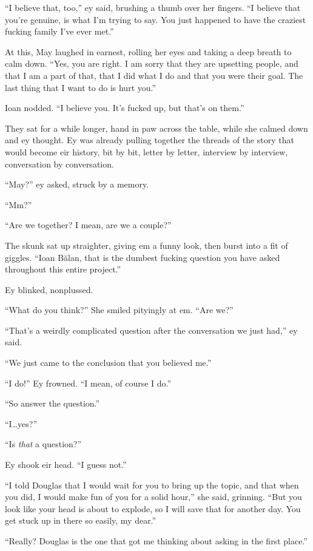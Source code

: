 ``I believe that, too,'' ey said, brushing a thumb over her fingers. ``I believe that you're genuine, is what I'm trying to say. You just happened to have the craziest fucking family I've ever met.''

At this, May laughed in earnest, rolling her eyes and taking a deep breath to calm down. ``Yes, you are right. I am sorry that they are upsetting people, and that I am a part of that, that I did what I do and that you were their goal. The last thing that I want to do is hurt you.''

Ioan nodded. ``I believe you. It's fucked up, but that's on them.''

They sat for a while longer, hand in paw across the table, while she calmed down and ey thought. Ey was already pulling together the threads of the story that would become eir history, bit by bit, letter by letter, interview by interview, conversation by conversation.

``May?'' ey asked, struck by a memory.

``Mm?''

``Are we together? I mean, are we a couple?''

The skunk sat up straighter, giving em a funny look, then burst into a fit of giggles. ``Ioan Bălan, that is the dumbest fucking question you have asked throughout this entire project.''

Ey blinked, nonplussed.

``What do you think?'' She smiled pityingly at em. ``Are we?''

``That's a weirdly complicated question after the conversation we just had,'' ey said.

``We just came to the conclusion that you believed me.''

``I do!'' Ey frowned. ``I mean, of course I do.''

``So answer the question.''

``I\ldots yes?''

``Is \emph{that} a question?''

Ey shook eir head. ``I guess not.''

``I told Douglas that I would wait for you to bring up the topic, and that when you did, I would make fun of you for a solid hour,'' she said, grinning. ``But you look like your head is about to explode, so I will save that for another day. You get stuck up in there so easily, my dear.''

``Really? Douglas is the one that got me thinking about asking in the first place.''

